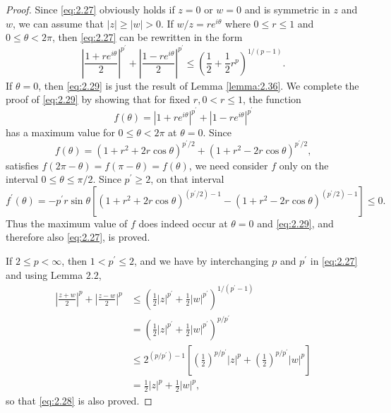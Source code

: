 \begin{proof}
  Since \eqref{eq:2.27} obviously holds if $z=0$ or $w=0$ and is symmetric in $z$ and $w$,
  we can assume that $|z| \geq |w| > 0$.
  If $w/z = re^{i\theta}$ where $0\leq r\leq 1$ and $0\leq\theta<2\pi$,
  then \eqref{eq:2.27} can be rewritten in the form
  \begin{equation}\label{eq:2.29}
  \left|\frac{1+r e^{i \theta}}{2}\right|^{p^{\prime}}
  + \left|\frac{1-r e^{i \theta}}{2}\right|^{p^{\prime}}
  \leq \left(\frac{1}{2}+\frac{1}{2} r^p\right)^{1 /(p-1)}.
  \end{equation}
  If $\theta=0$, then \eqref{eq:2.29} is just the result of Lemma \ref{lemma:2.36}.
  We complete the proof of \eqref{eq:2.29} by showing that for fixed $r, 0<r\leq 1$,
  the function
  \[f(\theta) = \left|1 + re^{i \theta}\right|^{p^{\prime}}
    + \left|1 - re^{i\theta}\right|^{p^{\prime}}\]
  has a maximum value for $0 \leq \theta < 2\pi$ at $\theta=0$. Since
  \[
  f(\theta) = \left(1+r^2+2r\cos\theta\right)^{p^{\prime} / 2}
    + \left(1+r^2-2r\cos\theta\right)^{p^{\prime} / 2},
  \]
  satisfies $f(2\pi-\theta) = f(\pi-\theta) = f(\theta)$,
  we need consider $f$ only on the interval $0 \leq\theta\leq\pi / 2$.
  Since $p^{\prime}\geq 2$, on that interval
  \[
  f^{\prime}(\theta) = -p^{\prime} r \sin\theta
    \left[\left(1+r^2+2 r \cos \theta\right)^{\left(p^{\prime} / 2\right)-1}
      - \left(1+r^2-2 r \cos \theta\right)^{\left(p^{\prime} / 2\right)-1}\right]\leq 0 .
  \]
  Thus the maximum value of $f$ does indeed occur at $\theta=0$ and \eqref{eq:2.29},
  and therefore also \eqref{eq:2.27}, is proved.

  If $2 \leq p<\infty$, then $1 < p^{\prime} \leq 2$,
  and we have by interchanging $p$ and $p^{\prime}$ in \eqref{eq:2.27}
  and using Lemma $2.2$,
  \begin{align*}
  \left|\frac{z+w}{2}\right|^p+\left|\frac{z-w}{2}\right|^p 
  & \leq\left(\frac{1}{2}|z|^{p^{\prime}}+\frac{1}{2}|w|^{p^{\prime}}\right)^{1 /\left(p^{\prime}-1\right)} \\
  & = \left(\frac{1}{2}|z|^{p^{\prime}}+\frac{1}{2}|w|^{p^{\prime}}\right)^{p/p^{\prime}} \\
  & \leq 2^{\left(p / p^{\prime}\right)-1}
    \left[\left(\frac{1}{2}\right)^{p / p^{\prime}}|z|^p
      + \left(\frac{1}{2}\right)^{p / p^{\prime}}|w|^p\right] \\
  & = \frac{1}{2}|z|^p+\frac{1}{2}|w|^p,
  \end{align*}
  so that \eqref{eq:2.28} is also proved.
\end{proof}


